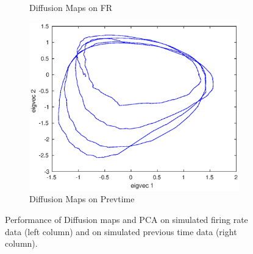 \begin{figure}[H]
\begin{subfigure}[b]{0.475\textwidth}
            \caption[]%
             {{\small Diffusion Maps on FR}}    
            \label{fig:Diffusion maps on Prevtime in 3D}
        \end{subfigure}
        \quad
        \begin{subfigure}[b]{0.475\textwidth}   
            \centering 
             \includegraphics[width=\textwidth]{./images/FinalOralPlots/SyntheticOralPaper/SimPrevtimeDML1.eps}
            \caption[]%
            {{\small Diffusion Maps on Prevtime}}  
            \label{fig:Diffusion maps on Prevtime in 3D }
        \end{subfigure}
        \caption[Performance of Diffusion maps and PCA on data ]
         {\small Performance of Diffusion maps and PCA  on simulated firing rate data (left column) and on simulated previous                 time data (right column). } 
        \label{fig:DiffMaps_PCA_on_Prevtime_FR}
\end{figure}



















